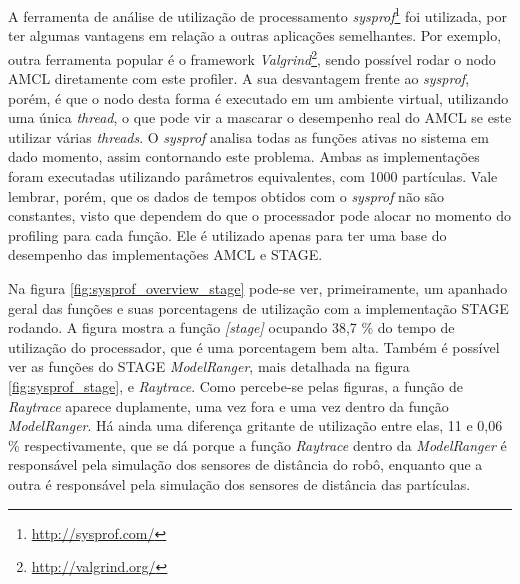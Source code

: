 \documentclass[
	12pt,				%
	openright,			%
	oneside,			%
	a4paper,			%
	english,			%
	french,				%
	spanish,			%
	brazil,				%
	]{abntex2}
\begin{document}
A ferramenta de análise de utilização de processamento \emph{sysprof}\footnote{\url{http://sysprof.com/}} foi utilizada, por ter algumas vantagens em relação a outras aplicações semelhantes. Por exemplo, outra ferramenta popular é o framework \emph{Valgrind}\footnote{\url{http://valgrind.org/}}, sendo possível rodar o nodo AMCL diretamente com este profiler. A sua desvantagem frente ao \emph{sysprof}, porém, é que o nodo desta forma é executado em um ambiente virtual, utilizando uma única \emph{thread}, o que pode vir a mascarar o desempenho real do AMCL se este utilizar várias \emph{threads}. O \emph{sysprof} analisa todas as funções ativas no sistema em dado momento, assim contornando este problema. Ambas as implementações foram executadas utilizando parâmetros equivalentes, com 1000 partículas. Vale lembrar, porém, que os dados de tempos obtidos com o \emph{sysprof} não são constantes, visto que dependem do que o processador pode alocar no momento do profiling para cada função. Ele é utilizado apenas para ter uma base do desempenho das implementações AMCL e STAGE.\par

Na figura \ref{fig:sysprof_overview_stage} pode-se ver, primeiramente, um apanhado geral das funções e suas porcentagens de utilização com a implementação STAGE rodando. A figura mostra a função \emph{[stage]} ocupando 38,7 \% do tempo de utilização do processador, que é uma porcentagem bem alta. Também é possível ver as funções do STAGE \emph{ModelRanger}, mais detalhada na figura \ref{fig:sysprof_stage}, e \emph{Raytrace}. Como percebe-se pelas figuras, a função de \emph{Raytrace} aparece duplamente, uma vez fora e uma vez dentro da função \emph{ModelRanger}. Há ainda uma diferença gritante de utilização entre elas, 11 e 0,06 \% respectivamente, que se dá porque a função \emph{Raytrace} dentro da \emph{ModelRanger} é responsável pela simulação dos sensores de distância do robô, enquanto que a outra é responsável pela simulação dos sensores de distância das partículas.\par
\end{document}
